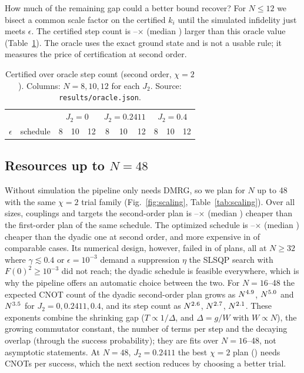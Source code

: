 \documentclass[aps,pra,twocolumn,superscriptaddress,nofootinbib]{revtex4-2}
\begin{document}
How much of the remaining gap could a better bound recover? For $N\le12$ we bisect a common scale
factor on the certified $k_i$ until the simulated infidelity just meets $\epsilon$. The certified step
count is \oracleMin--\oracleMax$\times$ (median \oracleMed) larger than this oracle value
(Table~\ref{tab:oracle}). The oracle uses the exact ground state and is not a usable rule; it measures
the price of certification at second order.

\begin{table}[t]
\caption{Certified over oracle step count (second order, $\chi=2$). Columns: $N=8,10,12$ for each
$J_2$. Source: \texttt{results/oracle.json}.}
\label{tab:oracle}
\begin{ruledtabular}
\begin{tabular}{llrrrrrrrrr}
 & & \multicolumn{3}{c}{$J_2=0$} & \multicolumn{3}{c}{$J_2=0.2411$} & \multicolumn{3}{c}{$J_2=0.4$}\\
$\epsilon$ & schedule & 8 & 10 & 12 & 8 & 10 & 12 & 8 & 10 & 12\\
\midrule

\end{tabular}
\end{ruledtabular}
\end{table}

\subsection{Resources up to $N=48$}

Without simulation the pipeline only needs DMRG, so we plan for $N$ up to 48 with the same $\chi=2$
trial family (Fig.~\ref{fig:scaling}, Table~\ref{tab:scaling}). Over all sizes, couplings and targets
the second-order plan is \gainOrderMin--\gainOrderMax$\times$ (median \gainOrderMed) cheaper than the
first-order plan of the same schedule. The optimized schedule is \gainOptMin--\gainOptMax$\times$
(median \gainOptMed) cheaper than the dyadic one at second order, and more expensive in \nDyaWins{} of
\nOptCmp{} comparable cases. Its numerical design, however, failed in \nScaleFail{} of \nScale{} plans,
all at $N\ge32$ where $\gamma\lesssim0.4$ or $\epsilon=10^{-3}$ demand a suppression $\eta$ the
SLSQP search with $F(0)^2\ge10^{-3}$ did not reach; the dyadic schedule is feasible everywhere, which
is why the pipeline offers an automatic choice between the two. For $N=16$--48 the expected CNOT count
of the dyadic second-order plan grows as $N^{4.9}$, $N^{5.0}$ and
$N^{3.5}$ for $J_2=0,0.2411,0.4$, and its step count as $N^{2.6}$,
$N^{2.7}$, $N^{2.1}$. These exponents combine the shrinking gap
($T\propto1/\Delta$, and $\Delta=g/W$ with $W\propto N$), the growing commutator constant, the number of
terms per step and the decaying overlap (through the success probability); they are fits over $N=16$--48, not asymptotic
statements. At $N=48$, $J_2=0.2411$ the best $\chi=2$ plan (\schedFortyEight) needs
\cnotFortyEight{} CNOTs per success, which the next section reduces by choosing a better trial.
\end{document}
